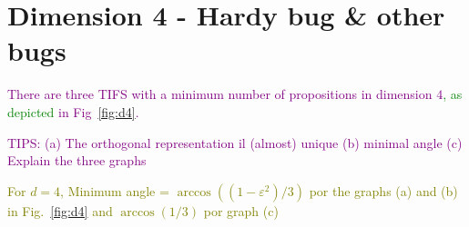 \documentclass[%
  twocolumn,
 showpacs,
 showkeys,
 preprintnumbers,
 amsmath,amssymb,
 aps,
  pra,
  longbibliography,
 floatfix,
 ]{revtex4-1}
\newcommand{\karllate}[1]{\textcolor{green}{#1}}
\newcommand{\jr}[1]{\textcolor{purple}{#1}}
\newcommand{\meil}[1]{\textcolor{olive}{#1}}
\begin{document}

\section{Dimension 4 - Hardy bug \& other bugs}

\jr{There are three TIFS with a minimum number of propositions in dimension $4$\karllate{, as depicted} in Fig~\ref{fig:d4}.}


\jr{TIPS: (a) The orthogonal representation il (almost) unique (b) minimal angle (c) Explain the three graphs}

\meil{For $d=4$, Minimum angle = $\arccos((1-\varepsilon^2)/3)$ por the graphs (a) and (b) in Fig.~\ref{fig:d4} and $\arccos(1/3)$ por graph (c)}

\end{document}
